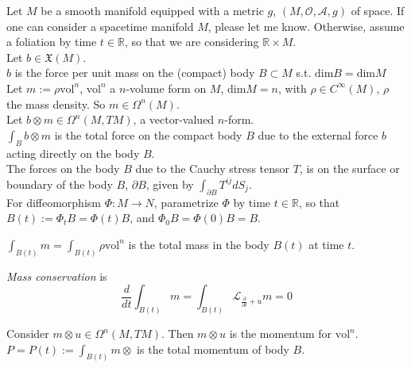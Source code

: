\documentclass[twoside,landscape,10pt]{amsart}
\theoremstyle{plain}
\theoremstyle{definition}
\theoremstyle{remark}
\begin{document}
\begin{multicols*}{2}
Let $M$ be a smooth manifold equipped with a metric $g$, $(M,\mathcal{O},\mathcal{A},g)$ of space.  If one can consider a spacetime manifold $M$, please let me know.  Otherwise, assume a foliation by time $t\in \mathbb{R}$, so that we are considering $\mathbb{R}\times M$.  \\
Let $b \in \mathfrak{X}(M)$. \\
\phantom{Let} $b$ is the force per unit mass on the (compact) body $B\subset M$ s.t. $\text{dim}B = \text{dim}M$  \\
Let $m:= \rho \text{vol}^n$, $\text{vol}^n$ a $n$-volume form on $M$, $\text{dim}M=n$, with $\rho \in C^{\infty}(M)$, $\rho$ the mass density.  So $m\in \Omega^n(M)$.  \\
Let $b\otimes m \in \Omega^n(M,TM)$, a vector-valued $n$-form.  \\
$\int_B b\otimes m$ is the total force on the compact body $B$ due to the external force $b$ acting directly on the body $B$.  \\
The forces on the body $B$ due to the Cauchy stress tensor $T$, is on the surface or boundary of the body $B$, $\partial B$, given by $\int_{\partial B} T^{ij} dS_j$.   \\
For diffeomorphism $\Phi : M \to N$, parametrize $\Phi$ by time $t\in \mathbb{R}$, so that $B(t) := \Phi_t B = \Phi(t)B$, and $\Phi_0 B = \Phi(0)B = B$.    

$\int_{B(t)} m = \int_{B(t)} \rho \text{vol}^n$ is the total mass in the body $B(t)$ at time $t$.  

\emph{Mass conservation} is 
\begin{equation}
  \frac{d}{dt} \int_{B(t)} m = \int_{B(t)} \mathcal{L}_{\frac{ \partial }{ \partial t} + u } m = 0 
\end{equation}

Consider $m \otimes u \in \Omega^n(M,TM)$.  Then $m\otimes u$ is the momentum for $\text{vol}^n$.  $P=P(t):= \int_{B(t)} m\otimes $ is the total momentum of body $B$.  


\end{multicols*}
\end{document}
